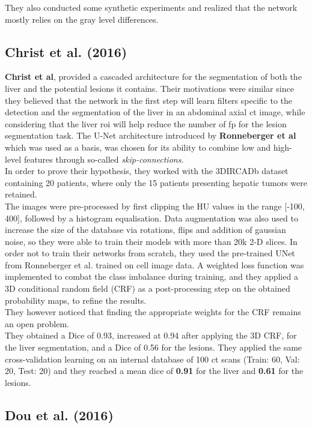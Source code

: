 They also conducted some synthetic experiments and realized that the
network mostly relies on the gray level differences.

\subsection*{Christ et al. (2016)}\label{christ-et-al.-2016}

\textbf{Christ et al}, provided a cascaded architecture for the
segmentation of both the liver and the potential lesions it contains.
Their motivations were similar since they believed that the network in
the first step will learn filters specific to the detection and the
segmentation of the liver in an abdominal axial \ac{ct} image, while
considering that the liver \ac{roi} will help reduce the number of \ac{fp} for the
lesion segmentation task. The U-Net architecture introduced by
\textbf{Ronneberger et al} which was used as a basis, was chosen for its
ability to combine low and high-level features through so-called
\emph{skip-connections}. \\
In order to prove their hypothesis, they worked with the 3DIRCADb
dataset containing 20 patients, where only the 15 patients presenting
hepatic tumors were retained. \\
The images were pre-processed by first clipping the HU values in the
range {[}-100, 400{]}, followed by a histogram equalisation. Data
augmentation was also used to increase the size of the database via
rotations, flips and addition of gaussian noise, so they were able to
train their models with more than 20k 2-D slices. In order not to train
their networks from scratch, they used the pre-trained UNet from
Ronneberger et al. trained on cell image data. A weighted loss function
was implemented to combat the class imbalance during training, and they
applied a 3D conditional random field (CRF) as a post-processing step on
the obtained probability maps, to refine the results.\\
They however noticed that finding the appropriate weights for the CRF
remains an open problem.\\
They obtained a Dice of 0.93, increased at 0.94 after applying the 3D
CRF, for the liver segmentation, and a Dice of 0.56 for the lesions.
They applied the same cross-validation learning on an internal database
of 100 \ac{ct} scans (Train: 60, Val: 20, Test: 20) and they reached a mean dice
of \textbf{0.91} for the liver and \textbf{0.61} for the lesions.

\subsection*{Dou et al. (2016)}\label{dou-et-al.-2016}

